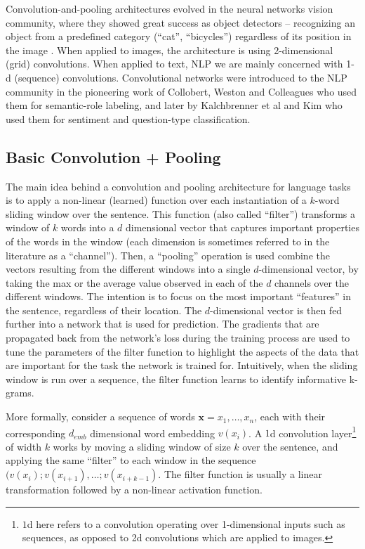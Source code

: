 \documentclass[jair,twoside,11pt,theapa]{article}
\newcommand{\m}[1]{\mathbf{#1}}%
\renewcommand{\shortcite}[0]{\citeyear}
\begin{document}
{Convolution-and-pooling architectures \cite{lecun1995convolutional} evolved in the neural
networks vision community, where
they showed great success as object detectors -- recognizing an object from a
predefined category (``cat'', ``bicycles'') regardless of its position in the
image \cite{krizhevsky2012imagenet}.  When applied to images, the architecture is using
2-dimensional (grid) convolutions.  When applied to text, NLP we are mainly
concerned with 1-d (sequence) convolutions.  Convolutional networks were introduced
to the NLP community in the pioneering work of Collobert, Weston and Colleagues \shortcite{collobert2011natural}
who used them for semantic-role labeling, and later by Kalchbrenner et al \shortcite{kalchbrenner2014convolutional}
and Kim \cite{kim2014convolutional} who used them for sentiment and question-type classification.

\subsection{Basic Convolution + Pooling}
The main idea behind a convolution and pooling architecture for language tasks
is to apply a non-linear (learned) function over each instantiation of a $k$-word sliding
window over the
sentence. This
function (also called ``filter'') transforms a window of $k$ words into a
$d$ dimensional vector that
captures important properties of the words in the window (each dimension is
sometimes referred to in the literature as a ``channel''). Then, a ``pooling''
operation is used combine the vectors resulting from the different windows into
a single $d$-dimensional vector, by taking the max or the average value observed in each of the
$d$ channels over the different windows.  The intention is to focus on the
most important ``features'' in the sentence, regardless of their location.
The $d$-dimensional vector is then fed further into a network that is used
for prediction. The gradients that are propagated back from the network's loss
during the training process are used to tune the parameters of the filter
function to highlight the aspects of the data that are important for the task
the network is trained for.  Intuitively, when the sliding window is run over a sequence,
the filter function learns to identify informative k-grams.

More formally, consider a sequence of words $\m{x} = x_1,\ldots,x_n$, each with their
corresponding $d_{emb}$ dimensional word embedding $v(x_i)$.  A $1$d convolution
layer\footnote{$1$d here refers to a convolution operating over 1-dimensional
inputs such as sequences, as opposed to 2d convolutions which are
applied to images.} of width $k$ works by moving a sliding window of size $k$ over the
sentence, and applying the same ``filter'' to each window in the sequence
$(v(x_i);v(x_{i+1}),\ldots;v(x_{i+k-1})$. 
The filter function is usually a linear transformation followed by a non-linear activation function.

}
\end{document}
